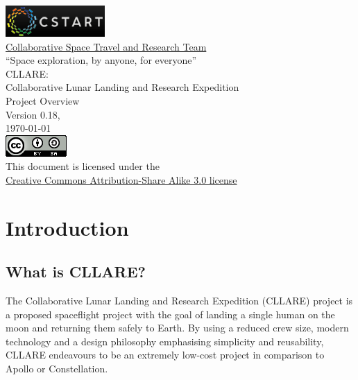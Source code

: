\documentclass{report}
\begin{document}
\begin{titlepage}
\centering
\includegraphics{images/cstart_logo} \\
\Large{\href{http://www.cstart.org}{Collaborative Space Travel and Research Team}} \\
\vspace{0.5cm}
\large{``Space exploration, by anyone, for everyone''} \\
\vspace{4.0cm}
\Large{CLLARE:} \\
\Large{Collaborative Lunar Landing and Research Expedition} \\
\Large{Project Overview} \\
\vspace{2.0cm}
\normalsize{Version 0.18, \\
\today} \\
\vspace{4.0cm}
\includegraphics{images/cc_badge} \\
This document is licensed under the \\
\href{http://creativecommons.org/licenses/by-sa/3.0/}{Creative Commons Attribution-Share Alike 3.0 license}
\end{titlepage}

\tableofcontents

\chapter{Introduction}

\section{What is CLLARE?}

The Collaborative Lunar Landing and Research Expedition (CLLARE) project is a proposed spaceflight project with the goal of landing a single human on the moon and returning them safely to Earth.  By using a reduced crew size, modern technology and a design philosophy emphasising simplicity and reusability, CLLARE endeavours to be an extremely low-cost project in comparison to Apollo or Constellation.
\end{document}
